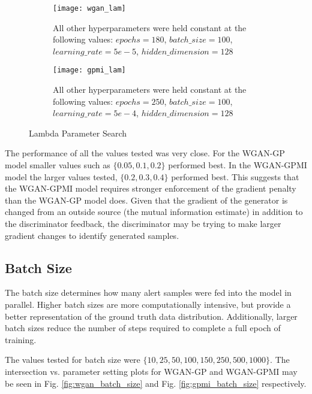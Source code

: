 \begin{figure}[!htbp]
	\centering

	\begin{subfigure}{.7\textwidth}
		\texttt{[image: wgan\_lam]}
	\end{subfigure}%
	\begin{subfigure}{.3\textwidth}
		\caption{
			All other hyperparameters were held constant at the following values: $epochs=180$, $batch\_size = 100$, $learning\_rate=5e-5$, $hidden\_dimension=128$
		}
		\label{fig:wgan_lam}
	\end{subfigure}%

	\begin{subfigure}{.7\textwidth}
		\texttt{[image: gpmi\_lam]}
	\end{subfigure}%
	\begin{subfigure}{.3\textwidth}
		\caption{
			All other hyperparameters were held constant at the following values: $epochs=250$, $batch\_size=100$, $learning\_rate=5e-4$, $hidden\_dimension=128$
		}
		\label{fig:gpmi_lam}
	\end{subfigure}%
	\caption{Lambda Parameter Search}
\end{figure}

The performance of all the values tested was very close. For the WGAN-GP model smaller values such as $\{0.05, 0.1, 0.2\}$ performed best. In the WGAN-GPMI model the larger values tested, $\{0.2,0.3,0.4\}$ performed best. This suggests that the WGAN-GPMI model requires stronger enforcement of the gradient penalty than the WGAN-GP model does. Given that the gradient of the generator is changed from an outside source (the mutual information estimate) in addition to the discriminator feedback, the discriminator may be trying to make larger gradient changes to identify generated samples.

\subsection{Batch Size}
\label{sec:bs}

The batch size determines how many alert samples were fed into the model in parallel. Higher batch sizes are more computationally intensive, but provide a better representation of the ground truth data distribution. Additionally, larger batch sizes reduce the number of steps required to complete a full epoch of training.

The values tested for batch size were $\{10, 25, 50, 100, 150, 250, 500, 1000\}$. The intersection vs. parameter setting plots for WGAN-GP and WGAN-GPMI may be seen in Fig. \ref{fig:wgan_batch_size} and Fig. \ref{fig:gpmi_batch_size} respectively.

